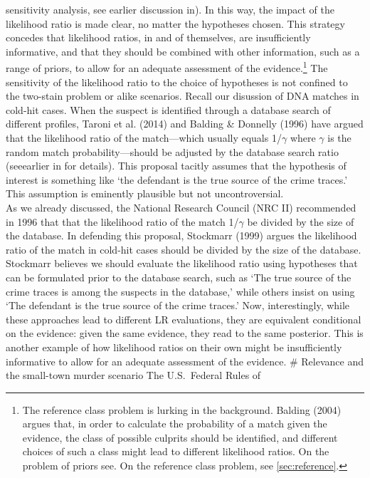 \documentclass[10pt,dvipsnames,enabledeprecatedfontcommands]{scrartcl}
\begin{document}
sensitivity analysis, see earlier discussion in). In this
way, the impact of the likelihood ratio is made clear, no matter the
hypotheses chosen. This strategy concedes that likelihood ratios, in and
of themselves, are insufficiently informative, and that they should be
combined with other information, such as a range of priors, to allow for
an adequate assessment of the evidence.\footnote{The
  reference class problem is lurking in the background. Balding (2004)
  argues that, in order to calculate the probability of a match given
  the evidence, the class of possible culprits should be identified, and
  different choices of such a class might lead to different likelihood
  ratios. On the problem of priors see. On the reference class problem,
  see \ref{sec:reference}.} The sensitivity of the likelihood ratio to
the choice of hypotheses is not confined to the two-stain problem or
alike scenarios. Recall our disussion of DNA matches in cold-hit cases.
When the suspect is identified through a database search of different
profiles, Taroni et al. (2014) and Balding \& Donnelly (1996) have
argued that the likelihood ratio of the match---which usually equals
1/\(\gamma\) where \(\gamma\) is the random match probability---should
be adjusted by the database search ratio (seeearlier in 
for details). This proposal tacitly assumes that the hypothesis of
interest is something like `the defendant is the true source of the
crime traces.' This assumption is eminently plausible but not
uncontroversial.\\
As we already discussed, the National Research Council (NRC II)
recommended in 1996 that that the likelihood ratio of the match
1/\(\gamma\) be divided by the size of the database. In defending this
proposal, Stockmarr (1999) argues the likelihood ratio of the match in
cold-hit cases should be divided by the size of the database. Stockmarr
believes we should evaluate the likelihood ratio using hypotheses that
can be formulated prior to the database search, such as `The true source
of the crime traces is among the suspects in the database,' while others
insist on using `The defendant is the true source of the crime traces.'
Now, interestingly, while these approaches lead to different LR
evaluations, they are equivalent conditional on the evidence: given the
same evidence, they read to the same posterior. This is another example
of how likelihood ratios on their own might be insufficiently
informative to allow for an adequate assessment of the evidence. \#
Relevance and the small-town murder scenario The U.S.~Federal Rules of
\end{document}

